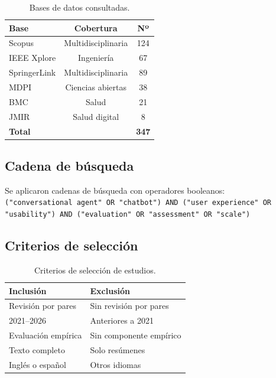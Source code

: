 \documentclass[11pt,twocolumn]{article}
\begin{document}
\begin{table}[H]
\centering
\caption{Bases de datos consultadas.}
\label{tab:fuentes}
\begin{tabular}{@{}lcc@{}}
\toprule
\textbf{Base} & \textbf{Cobertura} & \textbf{Nº} \\
\midrule
Scopus & Multidisciplinaria & 124 \\
IEEE Xplore & Ingeniería & 67 \\
SpringerLink & Multidisciplinaria & 89 \\
MDPI & Ciencias abiertas & 38 \\
BMC & Salud & 21 \\
JMIR & Salud digital & 8 \\
\midrule
\textbf{Total} & & \textbf{347} \\
\bottomrule
\end{tabular}
\end{table}

\subsection{Cadena de búsqueda}

Se aplicaron cadenas de búsqueda con operadores booleanos:\\
\texttt{("conversational agent" OR "chatbot") AND ("user experience" OR "usability") AND ("evaluation" OR "assessment" OR "scale")}

\subsection{Criterios de selección}

\begin{table}[H]
\centering
\caption{Criterios de selección de estudios.}
\label{tab:criterios}
\begin{tabular}{@{}p{3.2cm}p{3.2cm}@{}}
\toprule
\textbf{Inclusión} & \textbf{Exclusión} \\
\midrule
Revisión por pares & Sin revisión por pares \\
2021--2026 & Anteriores a 2021 \\
Evaluación empírica & Sin componente empírico \\
Texto completo & Solo resúmenes \\
Inglés o español & Otros idiomas \\
\bottomrule
\end{tabular}
\end{table}
\end{document}
